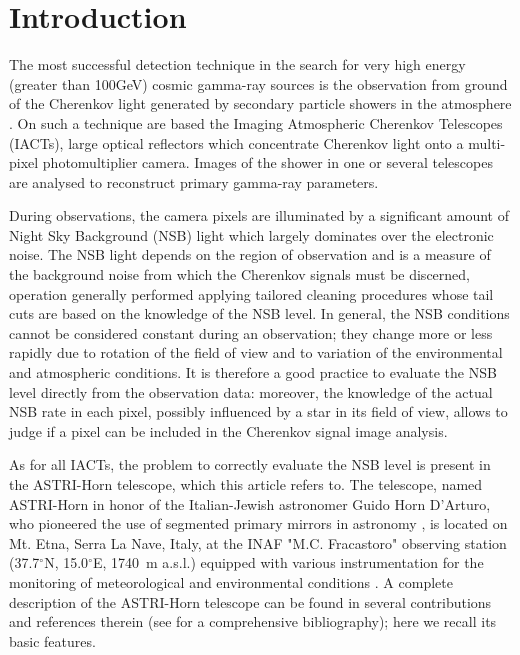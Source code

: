\section{Introduction}
\label{sect:intro}




The most successful detection technique in the search for very high energy (greater than 100GeV) cosmic gamma-ray sources is the observation from ground of the Cherenkov light generated by secondary particle showers in the atmosphere \citep{Ong1998}. On such a technique are based the Imaging Atmospheric Cherenkov Telescopes (IACTs), large optical reflectors which concentrate Cherenkov light onto a multi-pixel photomultiplier camera. Images of the shower in one or several telescopes are analysed to reconstruct primary gamma-ray parameters.

During observations, the camera pixels are illuminated by a significant amount of Night Sky Background (NSB) light which largely dominates over the electronic noise. The NSB light depends on the region of observation and is a measure of the background noise from which the Cherenkov signals must be discerned, operation generally performed applying tailored cleaning procedures whose tail cuts are based on the knowledge of the NSB level. In general, the NSB conditions cannot be considered constant during an observation; they change more or less rapidly due to rotation of the field of view and to variation of the environmental and atmospheric conditions. It is therefore a good practice to evaluate the NSB level directly from the observation data: moreover, the knowledge of the actual NSB rate in each pixel, possibly influenced by a star in its field of view, allows to judge if a pixel can be included in the Cherenkov signal image analysis.

As for all IACTs, the problem to correctly evaluate the NSB level is present in the ASTRI-Horn telescope, which this article refers to. The telescope, named ASTRI-Horn in honor of the Italian-Jewish astronomer Guido Horn D'Arturo, who pioneered the use of segmented primary mirrors in astronomy \citep{Horn}, is located on Mt. Etna, Serra La Nave, Italy, at the INAF "M.C. Fracastoro" observing station (37.7$^{\circ}$N, 15.0$^{\circ}$E, 1740~m a.s.l.)
equipped with various instrumentation for the monitoring of meteorological and environmental conditions \citep{Maccarone2013}. A complete description of the ASTRI-Horn telescope can be found in several contributions and references therein (see \citep{Lombardi2020} for a comprehensive bibliography); here we recall its basic features.

